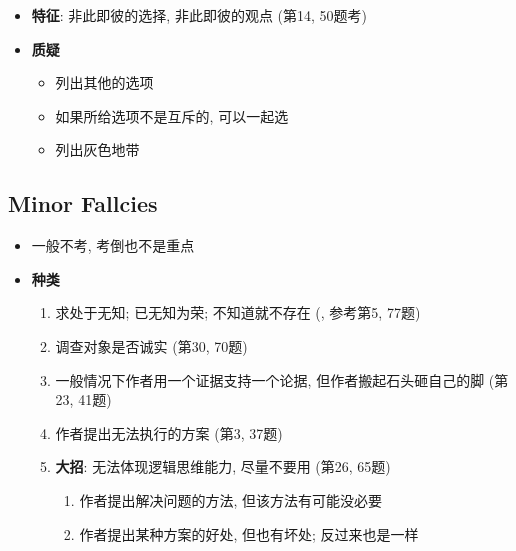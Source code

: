     \begin{itemize}
      \item \textbf{特征}: 非此即彼的选择, 非此即彼的观点 (第14, 50题考)
      \item \textbf{质疑}
      \begin{itemize}
        \item 列出其他的选项
        \item 如果所给选项不是互斥的, 可以一起选
        \item 列出灰色地带
      \end{itemize}
    \end{itemize}

  \subsection{Minor Fallcies}

    \begin{itemize}
      \item 一般不考, 考倒也不是重点
      \item \textbf{种类}
      \begin{enumerate}
        \item 求处于无知; 已无知为荣; 不知道就不存在
        (, 参考第5, 77题)
        \item 调查对象是否诚实 (第30, 70题)
        \item 一般情况下作者用一个证据支持一个论据, 但作者搬起石头砸自己的脚 (第23, 41题)
        \item 作者提出无法执行的方案 (第3, 37题)
        \item \textbf{大招}: 无法体现逻辑思维能力, 尽量不要用 (第26, 65题)
        \begin{enumerate}
          \item 作者提出解决问题的方法, 但该方法有可能没必要
          \item 作者提出某种方案的好处, 但也有坏处; 反过来也是一样
        \end{enumerate}
      \end{enumerate}
    \end{itemize}
